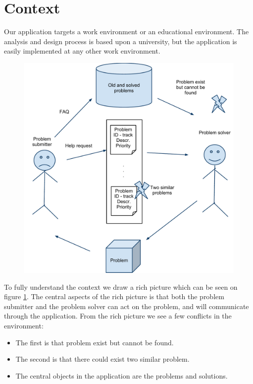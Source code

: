 \section{Context}
Our application targets a work environment or an educational environment.
The analysis and design process is based upon a university, but the application is easily implemented at any other work environment. 

\begin{figure}[ht]%
\includegraphics[scale = 0.42]{input/background/rich_picture.pdf}%
%
\label{fig:rich_picture}%
\end{figure}

To fully understand the context we draw a rich picture which can be seen on figure \ref{fig:rich_picture}. 
The central aspects of the rich picture is that both the problem submitter and the problem solver can act on the problem, and will communicate through the application. 
From the rich picture we see a few conflicts in the environment:
\begin{itemize}
		\item The first is that problem exist but cannot be found.
		\item The second is that there could exist two similar problem.
		\item The central objects in the application are the problems and solutions.
\end{itemize} 

